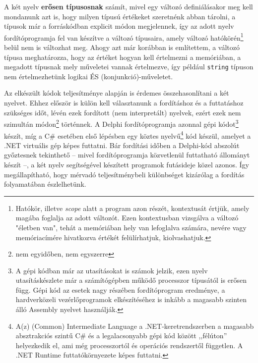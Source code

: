 \documentclass[tocnopagenum]{thesis-ekf}
\theoremstyle{definition}
\theoremstyle{remark}
\begin{document}
	A két nyelv \textbf{erősen típusosnak} számít, mivel egy változó definiálásakor meg kell mondanunk azt is, hogy milyen típusú értékeket szeretnénk abban tárolni, a típusok már a forráskódban explicit módon megjelennek, így az adott nyelv fordítóprogramja fel van készítve a változó típusaira, amely változó hatókörén\footnote{Hatókör, illetve \textit{scope} alatt a program azon részét, kontextusát értjük, amely magába foglalja az adott változót. Ezen kontextusban vizsgálva a változó "életben van", tehát a memóriában hely van lefoglalva számára, nevére vagy memóriacímére hivatkozva értékét felülírhatjuk, kiolvashatjuk.} belül nem is változhat meg. Ahogy azt már korábban is említettem, a változó típusa meghatározza, hogy az értéket hogyan kell értelmezni a memóriában, a megadott típusnak mely műveletei vannak értelmezve, így például \verb|string| típuson nem értelmezhetünk logikai ÉS (konjunkció)-műveletet.
	
	Az elkészült kódok teljesítménye alapján is érdemes összehasonlítani a két nyelvet. Ehhez először is külön kell választanunk a fordításhoz és a futtatáshoz szükséges időt, lévén ezek fordított (nem interpretált) nyelvek, ezért ezek nem szimultán módon\footnote{nem egyidőben, nem egyszerre} történnek. A Delphi fordítóprogramja azonnal gépi kódot\footnote{A gépi kódban már az utasításokat is számok jelzik, ezen nyelv utasításkészlete már a számítógépben működő processzor típusától is erősen függ. Gépi kód az esetek nagy részében fordítóprogram eredménye, a hardverközeli vezérlőprogramok elkészítéséhez is inkább a magasabb szinten álló Assembly nyelvet használják.} készít, míg a C\# esetében első lépésben egy köztes nyelvű\footnote{A(z) (Common) Intermediate Language a .NET-keretrendszerben a magasabb absztrakciós szintű C\# és a legalacsonyabb gépi kód között ,,félúton'' helyezkedik el, ami még processzortól és operációs rendszertől független. A .NET Runtime futtatókörnyezete képes futtatni.} kód készül, amelyet a .NET virtuális gép képes futtatni. Bár fordítási időben a Delphi-kód abszolút győztesnek tekinthető -- mivel fordítóprogramja közvetlenül futtatható állományt készít --, a két nyelv segítségével készített programok futásideje közel azonos. Így megállapítható, hogy mérvadó teljesítménybeli különbséget kizárólag a fordítás folyamatában észlelhetünk.
	
\end{document}
